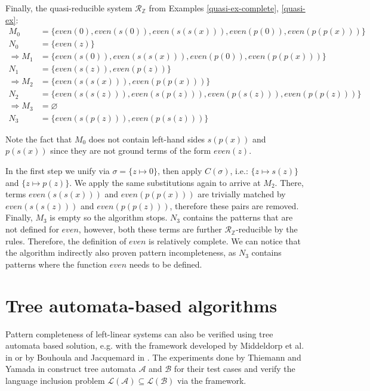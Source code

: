 \begin{example} \label{quasi-ex-alg} Finally, the quasi-reducible system $\mathcal{R}_\mathbb{Z}$ from Examples \ref{quasi-ex-complete}, \ref{quasi-ex}:
\begin{align*}
    M_0 &= \{even(0), even(s(0)), even(s(s(x))), even(p(0)), even(p(p(x)))\} \\
    N_0 &= \{even(z)\} \\
    \Rightarrow M_1 &= \{even(s(0)), even(s(s(x))), even(p(0)), even(p(p(x)))\} \\
    N_1 &= \{even(s(z)), even(p(z))\} \\
    \Rightarrow M_2 &= \{even(s(s(x))), even(p(p(x)))\} \\
    N_2 &= \{even(s(s(z))), even(s(p(z))), even(p(s(z))), even(p(p(z)))\} \\
    \Rightarrow M_3 &= \varnothing \\
    N_3 &= \{even(s(p(z))), even(p(s(z)))\}
\end{align*}

Note the fact that $M_0$ does not contain left-hand sides $s(p(x))$ and $p(s(x))$ since they are not ground terms of the form $even(z)$.

In the first step we unify via $\sigma = \{z \mapsto 0\}$, then apply $C(\sigma)$, i.e.: $\{z \mapsto s(z)\}$ and $\{z \mapsto p(z)\}$. We apply the same substitutions again to arrive at $M_2$. There, terms $even(s(s(x)))$ and $even(p(p(x)))$ are trivially matched by $even(s(s(z)))$ and $even(p(p(z)))$, therefore these pairs are removed. Finally, $M_3$ is empty so the algorithm stops. $N_3$ contains the patterns that are not defined for $even$, however, both these terms are further $\mathcal{R}_\mathbb{Z}$-reducible by the rules. Therefore, the definition of $even$ is relatively complete. We can notice that the algorithm indirectly also proven pattern incompleteness, as $N_3$ contains patterns where the function $even$ needs to be defined.

\end{example}

\section{Tree automata-based algorithms}
Pattern completeness of left-linear systems can also be verified using tree automata based solution, e.g. with the framework developed by Middeldorp et al. in \cite{middeldorp} or by Bouhoula and Jacquemard in \cite{bouhoula}. The experiments done by Thiemann and Yamada in \cite{thiemann} construct tree automata $\mathcal{A}$ and $\mathcal{B}$ for their test cases and verify the language inclusion problem $\mathcal{L}(\mathcal{A}) \subseteq \mathcal{L}(\mathcal{B})$ via the framework. 

